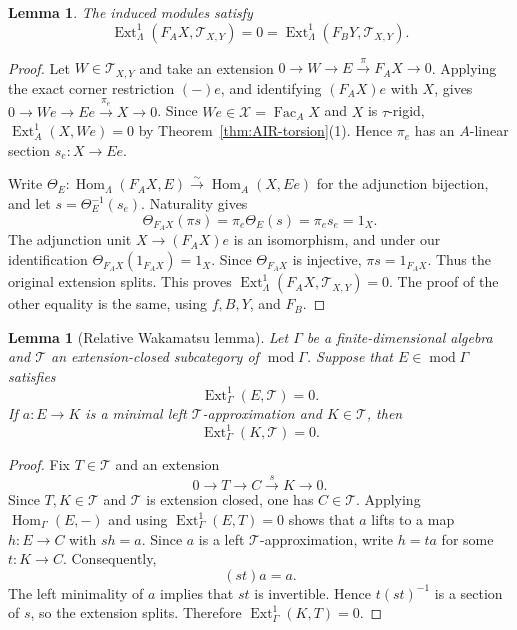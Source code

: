 \documentclass[11pt,reqno]{amsart}
\newtheorem{lemma}[theorem]{Lemma}
\theoremstyle{definition}
\theoremstyle{remark}
\newcommand{\modu}{\operatorname{mod}}
\newcommand{\Fac}{\operatorname{Fac}}
\newcommand{\Ext}{\operatorname{Ext}}
\newcommand{\Hom}{\operatorname{Hom}}
\numberwithin{equation}{section}
\begin{document}
\begin{lemma}\label{lem:corner-Ext-projective}
The induced modules satisfy
\[
 \Ext^1_\Lambda(F_AX,\mathcal T_{X,Y})=0
 =\Ext^1_\Lambda(F_BY,\mathcal T_{X,Y}).
\]
\end{lemma}

\begin{proof}
Let $W\in\mathcal T_{X,Y}$ and take an extension
$0\to W\to E\xrightarrow{\pi}F_AX\to0$.  Applying the exact corner
restriction $(-)e$, and identifying $(F_AX)e$ with $X$, gives
$0\to We\to Ee\xrightarrow{\pi_e}X\to0$.  Since
$We\in\mathcal X=\Fac_AX$ and $X$ is $\tau$-rigid,
$\Ext_A^1(X,We)=0$ by
Theorem~\ref{thm:AIR-torsion}\textup{(1)}.  Hence $\pi_e$
has an $A$-linear section $s_e:X\to Ee$.

Write
$\Theta_E:\Hom_\Lambda(F_AX,E)\xrightarrow{\sim}\Hom_A(X,Ee)$ for the
adjunction bijection, and let $s=\Theta_E^{-1}(s_e)$.  Naturality gives
\[
 \Theta_{F_AX}(\pi s)=\pi_e\Theta_E(s)=\pi_es_e=1_X.
\]
The adjunction unit $X\to(F_AX)e$ is an isomorphism, and under our
identification $\Theta_{F_AX}(1_{F_AX})=1_X$.  Since $\Theta_{F_AX}$ is
injective, $\pi s=1_{F_AX}$.  Thus the original extension splits.  This
proves $\Ext_\Lambda^1(F_AX,\mathcal T_{X,Y})=0$.  The proof of the other
equality is the same, using $f,B,Y$, and $F_B$.
\end{proof}


\begin{lemma}[Relative Wakamatsu lemma]\label{lem:Wakamatsu}
Let $\Gamma$ be a finite-dimensional algebra and $\mathcal T$ an
extension-closed subcategory of $\modu\Gamma$.  Suppose that
$E\in\modu\Gamma$ satisfies
\[
 \Ext^1_\Gamma(E,\mathcal T)=0.
\]
If $a:E\to K$ is a minimal left $\mathcal T$-approximation and
$K\in\mathcal T$, then
\[
 \Ext^1_\Gamma(K,\mathcal T)=0.
\]
\end{lemma}

\begin{proof}
Fix $T\in\mathcal T$ and an extension
\[
 0\longrightarrow T\longrightarrow C\xrightarrow{s}K\longrightarrow0.
\]
Since $T,K\in\mathcal T$ and $\mathcal T$ is extension closed, one has
$C\in\mathcal T$.  Applying $\Hom_\Gamma(E,-)$ and using
$\Ext^1_\Gamma(E,T)=0$ shows that $a$ lifts to a map $h:E\to C$ with
$sh=a$.  Since $a$ is a left $\mathcal T$-approximation, write $h=ta$ for
some $t:K\to C$.  Consequently,
\[
 (st)a=a.
\]
The left minimality of $a$ implies that $st$ is invertible.  Hence
$t(st)^{-1}$ is a section of $s$, so the extension splits.  Therefore
$\Ext^1_\Gamma(K,T)=0$.
\end{proof}
\end{document}

